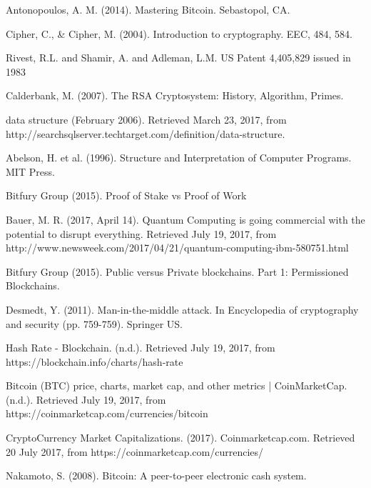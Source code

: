 \begin{thebibliography}{99}



{\sc Antonopoulos, A. M.} (2014).
Mastering Bitcoin.
{\em} Sebastopol, CA.

Cipher, C., \& Cipher, M. (2004). Introduction to cryptography. EEC, 484, 584.

Rivest, R.L. and Shamir, A. and Adleman, L.M. US Patent 4,405,829 issued in 1983

Calderbank, M. (2007). The RSA Cryptosystem: History, Algorithm, Primes.

{\sc data structure} (February 2006). Retrieved March 23, 2017, from http://searchsqlserver.techtarget.com/definition/data-structure.

{\sc Abelson, H. et al.} (1996).
Structure and Interpretation of Computer Programs.
MIT Press.

Bitfury Group (2015). Proof of Stake vs Proof of Work

Bauer, M. R. (2017, April 14). Quantum Computing is going commercial with the potential to disrupt everything. Retrieved July 19, 2017, from http://www.newsweek.com/2017/04/21/quantum-computing-ibm-580751.html

Bitfury Group (2015). Public versus Private blockchains. Part 1: Permissioned Blockchains.

Desmedt, Y. (2011). Man-in-the-middle attack. In Encyclopedia of cryptography and security (pp. 759-759). Springer US.

Hash Rate - Blockchain. (n.d.). Retrieved July 19, 2017, from https://blockchain.info/charts/hash-rate

Bitcoin (BTC) price, charts, market cap, and other metrics | CoinMarketCap. (n.d.). Retrieved July 19, 2017, from https://coinmarketcap.com/currencies/bitcoin

CryptoCurrency Market Capitalizations. (2017). Coinmarketcap.com. Retrieved 20 July 2017, from https://coinmarketcap.com/currencies/

Nakamoto, S. (2008). Bitcoin: A peer-to-peer electronic cash system.


\end{thebibliography}
